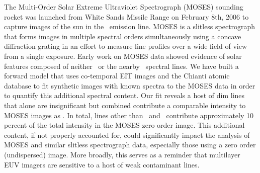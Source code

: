 The Multi-Order Solar Extreme Ultraviolet Spectrograph (MOSES) sounding rocket was launched from White Sands Missile Range on February 8th, 2006 to capture images of the sun in the \heii \ emission line.
MOSES is a slitless spectrograph that forms images in multiple spectral orders simultaneously using a concave diffraction grating in an effort to measure line profiles over a wide field of view from a single exposure.
Early work on MOSES data showed evidence of solar features composed of neither \heii \ or the nearby \sixi \ spectral lines.
We have built a forward model that uses co-temporal EIT images and the Chianti atomic database to fit synthetic images with known spectra to the MOSES data in order to quantify this additional spectral content.
Our fit reveals a host of dim lines that alone are insignificant but combined contribute a comparable intensity to MOSES images as \sixi.
In total, lines other than \heii\ and \sixi\ contribute approximately 10 percent of the total intensity in the MOSES zero order image.
This additional content, if not properly accounted for, could significantly impact the analysis of MOSES and similar slitless spectrograph data, especially those using a zero order (undispersed) image. 
More broadly, this serves as a reminder that multilayer EUV imagers are sensitive to a host of weak contaminant lines.
